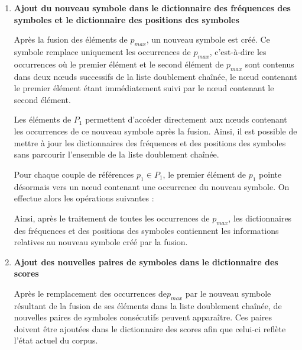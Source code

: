 \documentclass[12pt,a4paper]{report}
\begin{document}
\begin{enumerate}
\begin{enumerate}[label=\alph*)]
			\item \textbf{Ajout du nouveau symbole dans le dictionnaire des fréquences des symboles et le dictionnaire des positions des symboles}
			
			Après la fusion des éléments de $p_{max}$, un nouveau symbole est créé. Ce symbole remplace uniquement les occurrences de $p_{max}$, c'est-à-dire les occurrences où le premier élément et le second élément de $p_{max}$ sont contenus dans deux nœuds successifs de la liste doublement chaînée, le nœud contenant le premier élément étant immédiatement suivi par le nœud contenant le second élément.
			
			Les éléments de $P_1$ permettent d'accéder directement aux nœuds contenant les occurrences de ce nouveau symbole après la fusion. Ainsi, il est possible de mettre à jour les dictionnaires des fréquences et des positions des symboles sans parcourir l'ensemble de la liste doublement chaînée.
			
			Pour chaque couple de références $p_1 \in P_1$, le premier élément de $p_1$ pointe désormais vers un nœud contenant une occurrence du nouveau symbole. On effectue alors les opérations suivantes :
			
			
			Ainsi, après le traitement de toutes les occurrences de $p_{max}$, les dictionnaires des fréquences et des positions des symboles contiennent les informations relatives au nouveau symbole créé par la fusion.
			
			\item \textbf{Ajout des nouvelles paires de symboles dans le dictionnaire des scores}
			
			Après le remplacement des occurrences de$p_{max}$ par le nouveau symbole résultant de la fusion de ses éléments dans la liste doublement chaînée, de nouvelles paires de symboles consécutifs peuvent apparaître. Ces paires doivent être ajoutées dans le dictionnaire des scores afin que celui-ci reflète l'état actuel du corpus.
			

\end{enumerate}
\end{enumerate}
\end{document}

